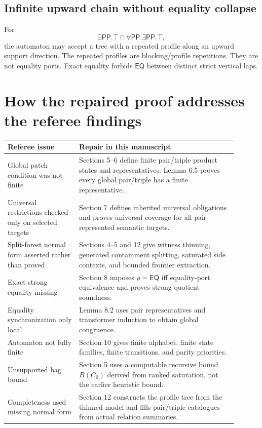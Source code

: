 \documentclass[11pt]{article}
\newcommand{\EQ}{\mathsf{EQ}}
\newcommand{\PP}{\mathsf{PP}}
\begin{document}
\subsection{Infinite upward chain without equality collapse}

For
\[
  \exists\PP.\top\sqcap\forall\PP.\exists\PP.\top,
\]
the automaton may accept a tree with a repeated profile along an upward support direction.  The repeated profiles are blocking/profile repetitions.  They are not equality ports.  Exact equality forbids $\EQ$ between distinct strict vertical laps.

\section{How the repaired proof addresses the referee findings}

\begin{longtable}{p{0.28\linewidth}p{0.62\linewidth}}
\toprule
Referee issue & Repair in this manuscript\\
\midrule
Global patch condition was not finite & Sections 5--6 define finite pair/triple product states and representatives.  Lemma 6.5 proves every global pair/triple has a finite representative.\\
Universal restrictions checked only on selected targets & Section 7 defines inherited universal obligations and proves universal coverage for all pair-represented semantic targets.\\
Split-forest normal form asserted rather than proved & Sections 4--5 and 12 give witness thinning, generated containment splitting, saturated side contexts, and bounded frontier extraction.\\
Exact strong equality missing & Section 8 imposes $\rho=\EQ$ iff equality-port equivalence and proves strong quotient soundness.\\
Equality synchronization only local & Lemma 8.2 uses pair representatives and transformer induction to obtain global congruence.\\
Automaton not fully finite & Section 10 gives finite alphabet, finite state families, finite transitions, and parity priorities.\\
Unsupported bag bound & Section 5 uses a computable recursive bound $B(C_0)$ derived from ranked saturation, not the earlier heuristic bound.\\
Completeness used missing normal form & Section 12 constructs the profile tree from the thinned model and fills pair/triple catalogues from actual relation summaries.\\
\bottomrule
\end{longtable}
\end{document}
